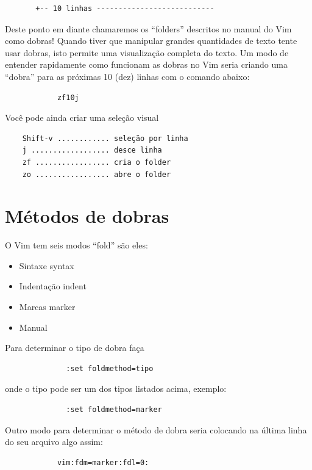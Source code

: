 \documentclass[10pt,a4paper,openany]{book}
\begin{document}
\begin{verbatim}
	   +-- 10 linhas ---------------------------
\end{verbatim}

Deste ponto em diante chamaremos os ``folders'' descritos no manual do
Vim como dobras!  Quando tiver que manipular grandes quantidades de
texto tente usar dobras, isto permite uma visualização completa do
texto.  Um modo de entender rapidamente como funcionam as dobras no
Vim seria criando uma ``dobra'' para as próximas 10 (dez) linhas com o
comando abaixo:

\begin{verbatim}
			zf10j
\end{verbatim}

Você pode ainda criar uma seleção visual

\begin{verbatim}
	Shift-v ............ seleção por linha
	j .................. desce linha
	zf ................. cria o folder
	zo ................. abre o folder
\end{verbatim}

\section{Métodos de dobras }
\label{Métodos de dobras }
O Vim tem seis modos ``fold'' são eles:

\begin{itemize}
\item Sintaxe syntax
\item Indentação indent
\item Marcas marker
\item Manual
\end{itemize}

Para determinar o tipo de dobra faça

\begin{verbatim}
			  :set foldmethod=tipo
\end{verbatim}

onde o tipo pode ser um dos tipos listados acima, exemplo:

\begin{verbatim}
			  :set foldmethod=marker
\end{verbatim}

Outro modo para determinar o método de dobra seria colocando na última
linha do seu arquivo algo assim:

\begin{verbatim}
			vim:fdm=marker:fdl=0:
\end{verbatim}
\end{document}
